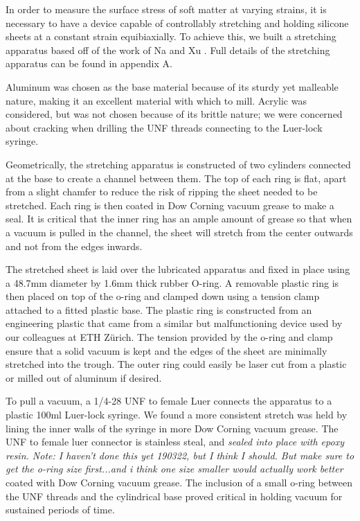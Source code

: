 

In order to measure the surface stress of soft matter at varying strains, it is necessary to have a device capable of controllably stretching and holding silicone sheets at a constant strain equibiaxially. To achieve this, we built a stretching apparatus based off of the work of Na \cite{na2008time} and Xu \cite{xu2017direct}. Full details of the stretching apparatus can be found in appendix A. 

Aluminum was chosen as the base material because of its sturdy yet malleable nature, making it an excellent material with which to mill. Acrylic was considered, but was not chosen because of its brittle nature; we were concerned about cracking when drilling the UNF threads connecting to the Luer-lock syringe.

Geometrically, the stretching apparatus is constructed of two cylinders connected at the base to create a channel between them. The top of each ring is flat, apart from a slight chamfer to reduce the risk of ripping the sheet needed to be stretched. Each ring is then coated in Dow Corning vacuum grease to make a seal. It is critical that the inner ring has an ample amount of grease so that when a vacuum is pulled in the channel, the sheet will stretch from the center outwards  and not from the edges inwards.  

The stretched sheet is laid over the lubricated apparatus and fixed in place using a 48.7mm diameter by 1.6mm thick rubber O-ring. A removable plastic ring is then placed on top of the o-ring and clamped down using a tension clamp attached to a fitted plastic base. The plastic ring is constructed from an engineering plastic that came from a similar but malfunctioning device used by our colleagues at ETH Zürich. The tension provided by the o-ring and clamp ensure that a solid vacuum is kept and the edges of the sheet are minimally stretched into the trough. The outer ring could easily be laser cut from a plastic or milled out of aluminum if desired. 

To pull a vacuum, a 1/4-28 UNF to female Luer connects the apparatus to a plastic 100ml Luer-lock syringe. We found a more consistent stretch was held by lining the inner walls of the syringe in more Dow Corning vacuum grease. The UNF to female luer connector is stainless steal, and \emph{sealed into place with epoxy resin. Note: I haven't done this yet 190322, but I think I should. But make sure to get the o-ring size first...and i think one size smaller would actually work better}
coated with Dow Corning vacuum grease. The inclusion of a small o-ring between the UNF threads and the cylindrical base proved critical in holding vacuum for sustained periods of time.

